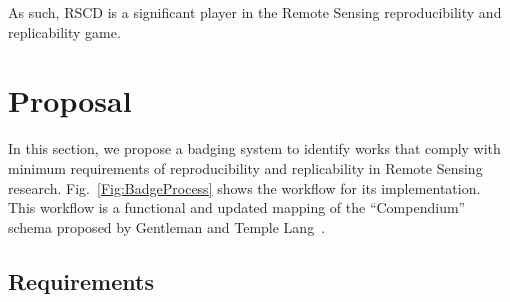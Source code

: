 \documentclass[journal,twoside]{IEEEtran}
\begin{document}
As such, RSCD is a significant player in the Remote Sensing reproducibility and replicability game.

\section{Proposal}\label{Sec:Proposal}

In this section, we propose a badging system to identify works that comply with minimum requirements of reproducibility and replicability in Remote Sensing research.
Fig.~\ref{Fig:BadgeProcess} shows the workflow for its implementation.
This workflow is a functional and updated mapping of the ``Compendium'' schema proposed by Gentleman and Temple Lang~\cite{StatisticalAnalysesReproducibleResearch}.

\subsection{Requirements}\label{Sec:Requirements}
\end{document}
